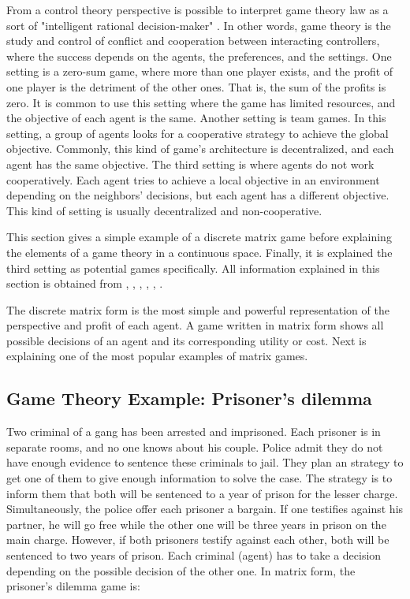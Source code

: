 From a control theory perspective is possible to interpret game theory law as a sort of "intelligent rational decision-maker" \cite{Marden2018}. In other words, game theory is the study and control of conflict and cooperation between interacting controllers, where the success depends on the agents, the preferences, and the settings.
One setting is a zero-sum game, where more than one player exists, and the profit of one player is the detriment of the other ones. That is, the sum of the profits is zero. It is common to use this setting where the game has limited resources, and the objective of each agent is the same.
Another setting is team games. In this setting, a group of agents looks for a cooperative strategy to achieve the global objective. Commonly, this kind of game's architecture is decentralized, and each agent has the same objective.
The third setting is where agents do not work cooperatively. Each agent tries to achieve a local objective in an environment depending on the neighbors' decisions, but each agent has a different objective. This kind of setting is usually decentralized and non-cooperative.


This section gives a simple example of a discrete matrix game before explaining the elements of a game theory in a continuous space. Finally, it is explained the third setting as potential games specifically. All information explained in this section is obtained from \cite{18t_article}, \cite{19t_article}, \cite{20t_article}, \cite{29t_book}, \cite{30t_phdthesis}, \cite{46t_inproceedings}.



The discrete matrix form is the most simple and powerful representation of the perspective and profit of each agent. A game written in matrix form shows all possible decisions of an agent and its corresponding utility or cost. Next is explaining one of the most popular examples of matrix games.

\subsection{Game Theory Example: Prisoner's dilemma}

Two criminal of a gang has been arrested and imprisoned. Each prisoner is in separate rooms, and no one knows about his couple. Police admit they do not have enough evidence to sentence these criminals to jail. They plan an strategy to get one of them to give enough information to solve the case. The strategy is to inform them that both will be sentenced to a year of prison for the lesser charge. Simultaneously, the police offer each prisoner a bargain. If one testifies against his partner, he will go free while the other one will be three years in prison on the main charge. However, if both prisoners testify against each other, both will be sentenced to two years of prison. Each criminal (agent) has to take a decision depending on the possible decision of the other one. In matrix form, the prisoner's dilemma game is: 


